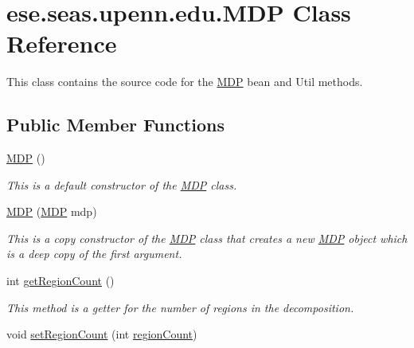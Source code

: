 \hypertarget{classese_1_1seas_1_1upenn_1_1edu_1_1_m_d_p}{}\section{ese.\+seas.\+upenn.\+edu.\+M\+D\+P Class Reference}
\label{classese_1_1seas_1_1upenn_1_1edu_1_1_m_d_p}


This class contains the source code for the \hyperlink{classese_1_1seas_1_1upenn_1_1edu_1_1_m_d_p}{M\+D\+P} bean and Util methods.  


\subsection*{Public Member Functions}
\begin{DoxyCompactItemize}
\item 
\hyperlink{classese_1_1seas_1_1upenn_1_1edu_1_1_m_d_p_af840f71801e34c9236b26a05e3633eb6}{M\+D\+P} ()
\begin{DoxyCompactList}\small\item\em This is a default constructor of the \hyperlink{classese_1_1seas_1_1upenn_1_1edu_1_1_m_d_p}{M\+D\+P} class. \end{DoxyCompactList}\item 
\hyperlink{classese_1_1seas_1_1upenn_1_1edu_1_1_m_d_p_aa2256090843c2276d839069d590dbcde}{M\+D\+P} (\hyperlink{classese_1_1seas_1_1upenn_1_1edu_1_1_m_d_p}{M\+D\+P} mdp)
\begin{DoxyCompactList}\small\item\em This is a copy constructor of the \hyperlink{classese_1_1seas_1_1upenn_1_1edu_1_1_m_d_p}{M\+D\+P} class that creates a new \hyperlink{classese_1_1seas_1_1upenn_1_1edu_1_1_m_d_p}{M\+D\+P} object which is a deep copy of the first argument. \end{DoxyCompactList}\item 
int \hyperlink{classese_1_1seas_1_1upenn_1_1edu_1_1_m_d_p_ae39dcfbf933f2e5f390851e1a81c06af}{get\+Region\+Count} ()
\begin{DoxyCompactList}\small\item\em This method is a getter for the number of regions in the decomposition. \end{DoxyCompactList}\item 
void \hyperlink{classese_1_1seas_1_1upenn_1_1edu_1_1_m_d_p_a37af1210f805afd89c3a047f2d0d88c9}{set\+Region\+Count} (int \hyperlink{classese_1_1seas_1_1upenn_1_1edu_1_1_m_d_p_ab06e750b3f8875deaacb13a575fcde5e}{region\+Count})

\end{DoxyCompactItemize}
